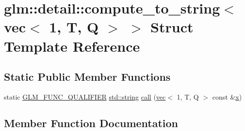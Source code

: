 \hypertarget{structglm_1_1detail_1_1compute__to__string_3_01vec_3_011_00_01_t_00_01_q_01_4_01_4}{}\section{glm\+:\+:detail\+:\+:compute\+\_\+to\+\_\+string$<$ vec$<$ 1, T, Q $>$ $>$ Struct Template Reference}
\label{structglm_1_1detail_1_1compute__to__string_3_01vec_3_011_00_01_t_00_01_q_01_4_01_4}
\subsection*{Static Public Member Functions}
\begin{DoxyCompactItemize}
\item 
static \mbox{\hyperlink{setup_8hpp_a33fdea6f91c5f834105f7415e2a64407}{G\+L\+M\+\_\+\+F\+U\+N\+C\+\_\+\+Q\+U\+A\+L\+I\+F\+I\+ER}} \mbox{\hyperlink{_s_d_l__opengl__glext_8h_ae84541b4f3d8e1ea24ec0f466a8c568b}{std\+::string}} \mbox{\hyperlink{structglm_1_1detail_1_1compute__to__string_3_01vec_3_011_00_01_t_00_01_q_01_4_01_4_ad8aa70be55855aba1c6c6796caf5b0cf}{call}} (\mbox{\hyperlink{structglm_1_1vec}{vec}}$<$ 1, T, Q $>$ const \&\mbox{\hyperlink{_s_d_l__opengl_8h_ad0e63d0edcdbd3d79554076bf309fd47}{x}})
\end{DoxyCompactItemize}


\subsection{Member Function Documentation}
\mbox{\label{structglm_1_1detail_1_1compute__to__string_3_01vec_3_011_00_01_t_00_01_q_01_4_01_4_ad8aa70be55855aba1c6c6796caf5b0cf}} 
